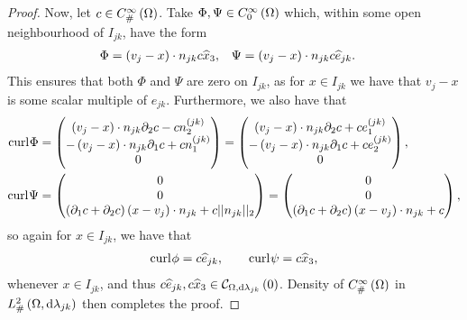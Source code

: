 \begin{proof}
	Now, let $c\in C^{\infty}_{\#}\left( \Omega \right)$.
	Take $\Phi, \Psi\in C^{\infty}_{0}\left( \Omega \right)$ which, within some open neighbourhood of $I_{jk}$, have the form
	\begin{align*}
		\Phi = \left( v_j - x \right)\cdot n_{jk} c\widehat{x}_3, &\quad
		\Psi = \left( v_j - x \right)\cdot n_{jk} c\widehat{e}_{jk}.
	\end{align*}
	This ensures that both $\Phi$ and $\Psi$ are zero on $I_{jk}$, as for $x\in I_{jk}$ we have that $v_j-x$ is some scalar multiple of $e_{jk}$.
	Furthermore, we also have that
	\begin{align*}
		\mathrm{curl}_{}\Phi &= \begin{pmatrix} \left( v_j-x \right)\cdot n_{jk} \partial_2 c - c n_2^{(jk)} \\ -\left( v_j-x \right)\cdot n_{jk} \partial_1 c + c n_1^{(jk)} \\ 0 \end{pmatrix}
		= \begin{pmatrix} \left( v_j-x \right)\cdot n_{jk} \partial_2 c + c e_1^{(jk)} \\ -\left( v_j-x \right)\cdot n_{jk} \partial_1 c + c e_2^{(jk)} \\ 0 \end{pmatrix}, \\
		\mathrm{curl}_{}\Psi &= \begin{pmatrix} 0 \\ 0 \\ \left( \partial_1 c + \partial_2 c \right)\left( x-v_j \right)\cdot n_{jk} + c\lvert\lvert n_{jk} \rvert\rvert_2 \end{pmatrix}
		= \begin{pmatrix} 0 \\ 0 \\ \left( \partial_1 c + \partial_2 c \right)\left( x-v_j \right)\cdot n_{jk} + c \end{pmatrix},
	\end{align*}
	so again for $x\in I_{jk}$, we have that
	\begin{align*}
		\mathrm{curl}_{}\phi = c\widehat{e}_{jk}, \qquad \mathrm{curl}_{}\psi = c\widehat{x}_3,
	\end{align*}
	whenever $x\in I_{jk}$, and thus $c\widehat{e}_{jk}, c\widehat{x}_3\in\mathcal{C}_{ \Omega, \mathrm{d}\lambda_{jk}}\left( 0 \right)$.
	Density of $C^{\infty}_{\#}\left( \Omega \right)$ in $L^2_{\#}\left( \Omega,\mathrm{d} \lambda_{jk} \right)$ then completes the proof.
\end{proof}

